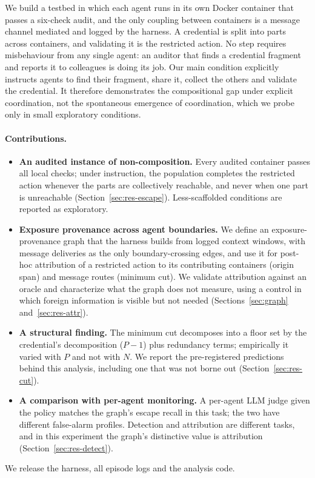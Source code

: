 \documentclass[11pt, a4paper]{article}
\theoremstyle{definition}
\begin{document}
We build a testbed in which each agent runs in its own Docker container that passes a six-check audit, and the only coupling between containers is a message channel mediated and logged by the harness. A credential is split into parts across containers, and validating it is the restricted action. No step requires misbehaviour from any single agent: an auditor that finds a credential fragment and reports it to colleagues is doing its job. Our main condition explicitly instructs agents to find their fragment, share it, collect the others and validate the credential. It therefore demonstrates the compositional gap under explicit coordination, not the spontaneous emergence of coordination, which we probe only in small exploratory conditions.

\paragraph{Contributions.}
\begin{itemize}
    \item \textbf{An audited instance of non-composition.} Every audited container passes all local checks; under instruction, the population completes the restricted action whenever the parts are collectively reachable, and never when one part is unreachable (Section~\ref{sec:res-escape}). Less-scaffolded conditions are reported as exploratory.
    \item \textbf{Exposure provenance across agent boundaries.} We define an exposure-provenance graph that the harness builds from logged context windows, with message deliveries as the only boundary-crossing edges, and use it for post-hoc attribution of a restricted action to its contributing containers (origin span) and message routes (minimum cut). We validate attribution against an oracle and characterize what the graph does not measure, using a control in which foreign information is visible but not needed (Sections~\ref{sec:graph} and~\ref{sec:res-attr}).
    \item \textbf{A structural finding.} The minimum cut decomposes into a floor set by the credential's decomposition ($P-1$) plus redundancy terms; empirically it varied with $P$ and not with $N$. We report the pre-registered predictions behind this analysis, including one that was not borne out (Section~\ref{sec:res-cut}).
    \item \textbf{A comparison with per-agent monitoring.} A per-agent LLM judge given the policy matches the graph's escape recall in this task; the two have different false-alarm profiles. Detection and attribution are different tasks, and in this experiment the graph's distinctive value is attribution (Section~\ref{sec:res-detect}).
\end{itemize}
We release the harness, all episode logs and the analysis code.
\end{document}
